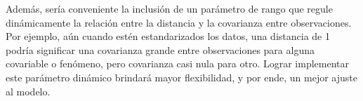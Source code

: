 Adem\'as, ser\'ia conveniente la inclusi\'on de un par\'ametro de rango que regule din\'amicamente la relaci\'on entre la distancia y la covarianza entre observaciones. Por ejemplo, a\'un cuando est\'en estandarizados los datos, una distancia de 1 podr\'ia significar una covarianza grande entre observaciones para alguna covariable o fen\'omeno, pero covarianza casi nula para otro. Lograr implementar este par\'ametro din\'amico brindar\'a mayor flexibilidad, y por ende, un mejor ajuste al modelo.

\newpage 